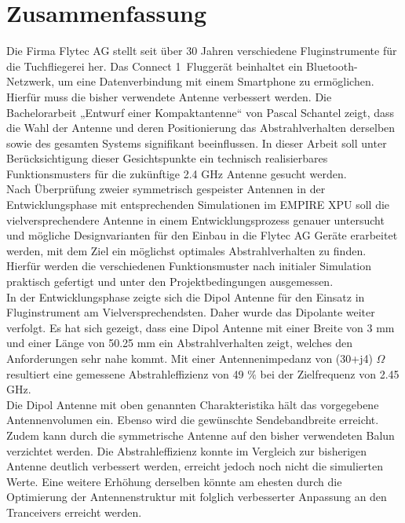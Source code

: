 \newpage
\section*{Zusammenfassung}

Die Firma Flytec AG stellt seit über 30 Jahren verschiedene Fluginstrumente für die Tuchfliegerei her. Das \glqq Connect 1\grqq\ Fluggerät beinhaltet ein Bluetooth-Netzwerk, um eine Datenverbindung mit einem Smartphone zu ermöglichen. Hierfür muss die bisher verwendete Antenne verbessert werden. Die Bachelorarbeit „Entwurf einer Kompaktantenne“ von Pascal Schantel zeigt, dass die Wahl der Antenne und deren Positionierung das Abstrahlverhalten derselben sowie des gesamten Systems signifikant beeinflussen. In dieser Arbeit soll unter Berücksichtigung dieser Gesichtspunkte ein technisch realisierbares Funktionsmusters für die zukünftige 2.4 GHz Antenne gesucht werden.\\
Nach Überprüfung zweier symmetrisch gespeister Antennen in der Entwicklungsphase mit entsprechenden Simulationen im EMPIRE XPU soll die vielversprechendere Antenne in einem  Entwicklungsprozess genauer untersucht und mögliche Designvarianten für den Einbau in die Flytec AG Geräte erarbeitet werden, mit dem Ziel ein möglichst optimales Abstrahlverhalten zu finden. Hierfür werden die verschiedenen Funktionsmuster nach initialer Simulation praktisch gefertigt und unter den Projektbedingungen ausgemessen.\\
In der Entwicklungsphase zeigte sich die Dipol Antenne für den Einsatz in Fluginstrument am Vielversprechendsten. Daher wurde das Dipolante weiter verfolgt. Es hat sich gezeigt, dass eine Dipol Antenne mit einer Breite von 3 mm und einer Länge von 50.25 mm ein Abstrahlverhalten zeigt, welches den Anforderungen sehr nahe kommt. Mit einer Antennenimpedanz von (30+j4) $\Omega$ resultiert eine gemessene Abstrahleffizienz von 49 $\%$ bei der Zielfrequenz von 2.45 GHz. \\
Die Dipol Antenne mit oben genannten Charakteristika hält das vorgegebene Antennenvolumen ein. Ebenso wird die gewünschte Sendebandbreite erreicht. Zudem kann durch die symmetrische Antenne auf den bisher verwendeten Balun verzichtet werden. Die Abstrahleffizienz konnte im Vergleich zur bisherigen Antenne deutlich verbessert werden, erreicht jedoch noch nicht die simulierten Werte. Eine weitere Erhöhung derselben könnte am ehesten durch die Optimierung der Antennenstruktur mit folglich verbesserter Anpassung an den Tranceivers erreicht werden. 



